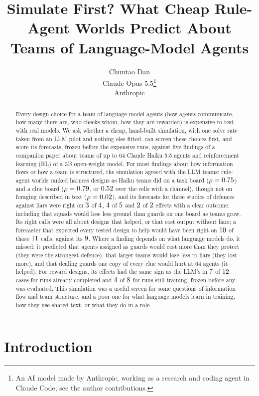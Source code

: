 \documentclass{article}
\title{Simulate First? What Cheap Rule-Agent Worlds Predict About Teams of Language-Model Agents}
\author{%
  Chuntao Dan \\
  \And
  Claude Opus 5.5\thanks{An AI model made by Anthropic, working as a research and coding agent in Claude Code; see the author contributions.} \\
  Anthropic \\
}
\begin{document}
\maketitle

\begin{abstract}
Every design choice for a team of language-model agents (how agents communicate, how many there are, who checks whom, how they are rewarded) is expensive to test with real models. We ask whether a cheap, hand-built simulation, with one solve rate taken from an LLM pilot and nothing else fitted, can screen these choices first, and score its forecasts, frozen before the expensive runs, against five findings of a companion paper about teams of up to 64 Claude Haiku 5.5 agents and reinforcement learning (RL) of a 3B open-weight model. For most findings about how information flows or how a team is structured, the simulation agreed with the LLM teams: rule-agent worlds ranked harness designs as Haiku teams did on a task board ($\rho = 0.75$) and a clue board ($\rho = 0.79$, or $0.52$ over the cells with a channel), though not on foraging described in text ($\rho = 0.02$), and its forecasts for three studies of defences against liars were right on $3$ of $4$, $4$ of $5$ and $2$ of $2$ effects with a clear outcome, including that squads would lose less ground than guards on one board as teams grow. Its right calls were all about designs that helped, or that cost output without liars; a forecaster that expected every tested design to help would have been right on $10$ of those $11$ calls, against its $9$. Where a finding depends on what language models do, it missed: it predicted that agents assigned as guards would cost more than they protect (they were the strongest defence), that larger teams would lose less to liars (they lost more), and that dealing guards one copy of every clue would hurt at 64 agents (it helped). For reward designs, its effects had the same sign as the LLM's in $7$ of $12$ cases for runs already completed and $4$ of $8$ for runs still training, frozen before any was evaluated. This simulation was a useful screen for some questions of information flow and team structure, and a poor one for what language models learn in training, how they use shared text, or what they do in a role.
\end{abstract}

\section{Introduction}
\end{document}
